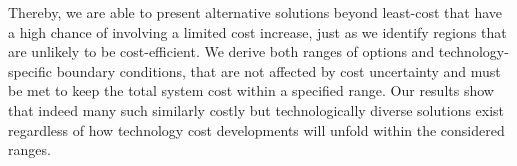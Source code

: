 
Thereby, we are able to present alternative solutions beyond least-cost that
have a high chance of involving a limited cost increase, just as we identify
regions that are unlikely to be cost-efficient. We derive both ranges of options
and technology-specific boundary conditions, that are not affected by cost
uncertainty and must be met to keep the total system cost within a specified
range. Our results show that indeed many such similarly costly but
technologically diverse solutions exist regardless of how technology cost
developments will unfold within the considered ranges.  








